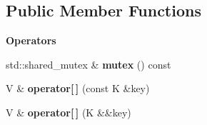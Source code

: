 \subsection*{Public Member Functions}
\begin{Indent}\textbf{ Operators}\par
\begin{DoxyCompactItemize}
\item 
\mbox{\label{classrev_1_1_threaded_map_a103407809740c948783f21f6c7fe7e11}} 
std\+::shared\+\_\+mutex \& {\bfseries mutex} () const
\item 
\mbox{\label{classrev_1_1_threaded_map_a82e3bd5f37c2c3ca5bc3f4c09483b5cd}} 
V \& {\bfseries operator\mbox{[}$\,$\mbox{]}} (const K \&key)
\item 
\mbox{\label{classrev_1_1_threaded_map_ab106d422ad3db902ddb779c774aef1b1}} 
V \& {\bfseries operator\mbox{[}$\,$\mbox{]}} (K \&\&key)
\end{DoxyCompactItemize}
\end{Indent}

